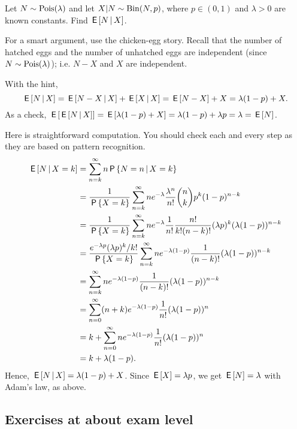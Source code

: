 \documentclass[assignments]{subfiles}
\begin{document}
\begin{exercise}
Let $N \sim \mathrm{Pois}(\lambda)$ and let  $X|N \sim \mathrm{Bin}(N, p)$, where $p \in (0,1)$ and $\lambda > 0$ are known constants. Find $\,\mathsf{E}\left[N \,\middle|\, X\right]$.
\begin{hint}
  For a smart argument, use the chicken-egg story.
  Recall that the number of hatched eggs and the number of unhatched eggs are independent (since $N \sim \mathrm{Pois}(\lambda)$); i.e.
  $N-X$ and $X$ are independent.
\end{hint}
\begin{solution}
With the hint,
\begin{equation*} \,\mathsf{E}\left[N \,\middle|\, X\right] = \,\mathsf{E}\left[N-X \,\middle|\, X\right] + \,\mathsf{E}\left[X \,\middle|\, X\right] = \,\mathsf{E}\left[N-X\right] + X = \lambda(1-p) + X. \end{equation*}
As a check, $\,\mathsf{E}\left[ \,\mathsf{E}\left[N \,\middle|\, X\right]\right] = \,\mathsf{E}\left[\lambda(1-p) + X\right] = \lambda(1-p)  + \lambda p = \lambda  = \,\mathsf{E}\left[N\right]$.

Here is straightforward computation.
You should check each and every step as they are based on pattern recognition.
\begin{align}
  \label{eq:22}
\,\mathsf{E}\left[N \,\middle|\, X=k\right]
&= \sum_{n=k}^{\infty} n \,\mathsf{P}\left\{N=n \,\middle|\, X=k \right\} \\
&= \frac{1}{\,\mathsf{P}\left\{X=k\right\}} \sum_{n=k}^{\infty} n e^{-\lambda}\frac{\lambda^{n}}{n!} {n \choose k} p^{k}(1-p)^{n-k} \\
&= \frac{1}{\,\mathsf{P}\left\{X=k\right\}}\sum_{n=k}^{\infty} n e^{-\lambda}\frac{1}{n!} \frac{n!}{k!(n-k)!}(\lambda p)^{k}(\lambda(1-p))^{n-k} \\
&= \frac{e^{-\lambda p} (\lambda p)^{k}/k!}{\,\mathsf{P}\left\{X=k\right\}}\sum_{n=k}^{\infty} n e^{-\lambda(1-p)}\frac{1}{(n-k)!}(\lambda(1-p))^{n-k} \\
&= \sum_{n=k}^{\infty} n e^{-\lambda(1-p)}\frac{1}{(n-k)!}(\lambda(1-p))^{n-k} \\
&= \sum_{n=0}^{\infty} (n+k) e^{-\lambda(1-p)}\frac{1}{n!}(\lambda(1-p))^{n} \\
&= k  + \sum_{n=0}^{\infty} n e^{-\lambda(1-p)}\frac{1}{n!}(\lambda(1-p))^{n} \\
&= k  + \lambda (1-p).
\end{align}
Hence, $\,\mathsf{E}\left[N\,\middle|\, X\right]= \lambda(1-p) + X$. Since $\,\mathsf{E}\left[X\right] = \lambda p$, we get $\,\mathsf{E}\left[N\right] = \lambda$ with Adam's law, as above.
\end{solution}
\end{exercise}



\subsection{Exercises at about exam level}
\label{sec:exercises-at-about-1}
\end{document}
